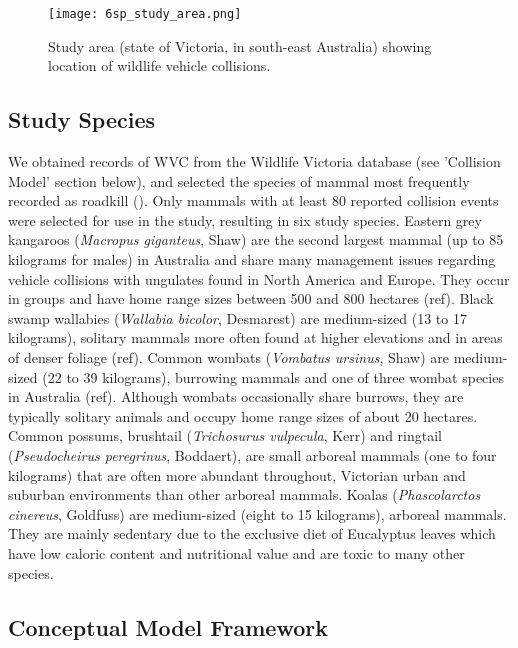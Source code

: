 \begin{figure*}[htp]
  \centering
  \texttt{[image: 6sp\_study\_area.png]}
  \caption[Wildlife-vehicle collisions in Victoria]{Study area (state of Victoria, in south-east Australia) showing location of wildlife vehicle collisions.}
  \label{6sp_study_area}
\end{figure*}

\subsection{Study Species}

We obtained records of WVC from the Wildlife Victoria database (see 'Collision Model' section below), and selected the species of mammal most frequently recorded as roadkill (). Only mammals with at least 80 reported collision events were selected for use in the study, resulting in six study species.  Eastern grey kangaroos (\textit{Macropus giganteus}, Shaw) are the second largest mammal (up to 85 kilograms for males) in Australia and share many management issues regarding vehicle collisions \citep{crof04,coul10} with ungulates found in North America and Europe. They occur in groups and have home range sizes between 500 and 800 hectares (ref).  Black swamp wallabies (\textit{Wallabia bicolor}, Desmarest) are medium-sized (13 to 17 kilograms), solitary mammals more often found at higher elevations and in areas of denser foliage (ref). Common wombats (\textit{Vombatus ursinus}, Shaw) are medium-sized (22 to 39 kilograms), burrowing mammals and one of three wombat species in Australia (ref). Although wombats occasionally share burrows, they are typically solitary animals and occupy home range sizes of about 20 hectares. Common possums, brushtail (\textit{Trichosurus vulpecula}, Kerr) and ringtail (\textit{Pseudocheirus peregrinus}, Boddaert), are small arboreal mammals (one to four kilograms) that are often more abundant throughout, Victorian urban and suburban environments than other arboreal mammals.  Koalas (\textit{Phascolarctos cinereus}, Goldfuss) are medium-sized (eight to 15 kilograms), arboreal mammals.  They are mainly sedentary due to the exclusive diet of Eucalyptus leaves which have low caloric content and nutritional value and are toxic to many other species.

\subsection{Conceptual Model Framework}

